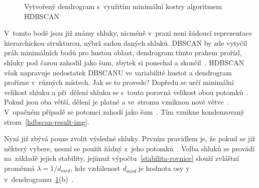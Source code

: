 \begin{figure}[hbt]
    \centering
    \caption{Vytvořený dendrogram s~využitím minimální kostry algoritmem HDBSCAN}
    \label{hdbscan-dendrogram-img}
\end{figure}

V~tomto bodě jsou již známy shluky, nicméně v~praxi není žádoucí reprezentace hierarchickou strukturou, nýbrž sadou daných shluků. DBSCAN by zde vytyčil práh minimálních bodů pro hustou oblast, dendrogram tímto prahem prořízl, shluky pod čarou zahodil jako šum, zbytek si ponechal a skončil~\cite{hdbscan}.
HDBSCAN však napravuje nedostatek DBSCANU ve variabilitě hustot a dendrogram prořízne v~různých místech. Jak se to provede? Dopředu se určí minimální velikost shluku a při~dělení shluku se s~touto porovná velikost obou potomků~\cite{hdbscan}. Pokud jsou oba větší, dělení je platné a ve~stromu vzniknou nové větve~\cite{hdbscan}. V~opačném případě se potomci zahodí jako šum~\cite{hdbscan}. Tím vznikne kondenzovaný strom~\ref{hdbscan-result-img}.

Nyní již zbývá pouze zvolit výsledné shluky. Prvním pravidlem je, že pokud se již některý vybere, nesmí se použít žádný z~jeho potomků~\cite{hdbscan}. Volba shluků se provádí na~základě jejich stability, jejímuž výpočtu~\ref{stabilita-rovnice} slouží zvláštní proměnná \(\lambda = 1 / d_{mrd}\), kde vzdálenost \emph{d\textsubscript{mrd}} je hodnota osy y v~dendrogramu~\ref{hdbscan-dendrogram-img}(b)~\cite{hdbscan}.

